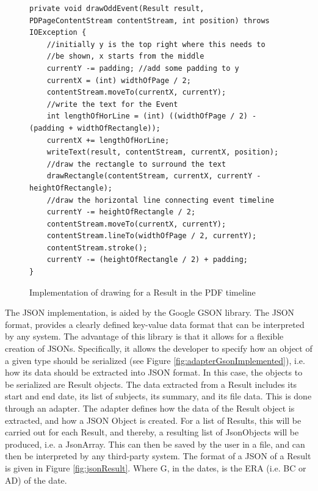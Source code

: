 \begin{figure}[H]
\begin{lstlisting}
private void drawOddEvent(Result result, PDPageContentStream contentStream, int position) throws IOException {
	//initially y is the top right where this needs to 
	//be shown, x starts from the middle
	currentY -= padding; //add some padding to y
	currentX = (int) widthOfPage / 2;
	contentStream.moveTo(currentX, currentY);
	//write the text for the Event
	int lengthOfHorLine = (int) ((widthOfPage / 2) - (padding + widthOfRectangle));
	currentX += lengthOfHorLine;
	writeText(result, contentStream, currentX, position);
	//draw the rectangle to surround the text
	drawRectangle(contentStream, currentX, currentY - heightOfRectangle);
	//draw the horizontal line connecting event timeline
	currentY -= heightOfRectangle / 2;
	contentStream.moveTo(currentX, currentY);
	contentStream.lineTo(widthOfPage / 2, currentY);
	contentStream.stroke();
	currentY -= (heightOfRectangle / 2) + padding;
}
\end{lstlisting}
\caption{Implementation of drawing for a Result in the PDF timeline}
\label{fig:drawRecImplemented}
\end{figure}

\par The JSON implementation, is aided by the Google GSON library. The JSON format, provides a clearly defined key-value data format that can be interpreted by any system. The advantage of this library is that it allows for a flexible creation of JSONs. Specifically, it allows the developer to specify how an object of a given type should be serialized (see Figure \ref{fig:adapterGsonImplemented}), i.e. how its data should be extracted into JSON format. In this case, the objects to be serialized are Result objects. The data extracted from a Result includes its start and end date, its list of subjects, its summary, and its file data. This is done through an adapter. The adapter defines how the data of the Result object is extracted, and how a JSON Object is created. For a list of Results, this will be carried out for each Result, and thereby, a resulting list of JsonObjects will be produced, i.e. a JsonArray. This can then be saved by the user in a file, and can then be interpreted by any third-party system. The format of a JSON of a Result is given in Figure \ref{fig:jsonResult}. Where G, in the dates, is the ERA (i.e. BC or AD) of the date.

